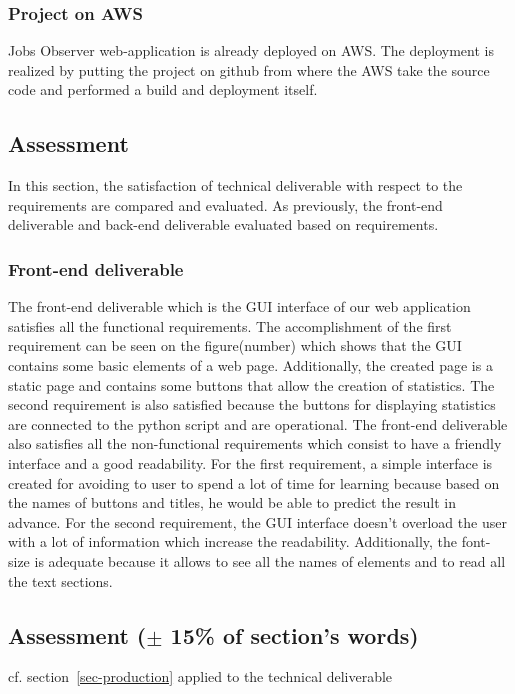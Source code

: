 \documentclass[conference,compsoc]{IEEEtran}
\begin{document}
\subsubsection{Project on AWS}
Jobs Observer web-application is already deployed on AWS. The deployment is realized by putting the project on github from where the AWS take the source code and performed a build and deployment itself. 

\subsection{Assessment}
In this section, the satisfaction of technical deliverable with respect to the requirements are compared and evaluated. As previously, the front-end deliverable and back-end deliverable evaluated based on requirements. 

\subsubsection{Front-end deliverable}
The front-end deliverable which is the GUI interface of our web application satisfies all the functional requirements. The accomplishment of the first requirement can be seen on the figure(number) which shows that the GUI contains some basic elements of a web page. Additionally, the created page is a static page and contains some buttons that allow the creation of statistics. 
\newline                                        
The second requirement is also satisfied because the buttons for displaying statistics are connected to the python script and are operational. 
\newline
The front-end deliverable also satisfies all the non-functional requirements which consist to have a friendly interface and a good readability. For the first requirement, a simple interface is created for avoiding to user to spend a lot of time for learning because based on the names of buttons and titles, he would be able to predict the result in advance.       
\newline                                                            
For the second requirement, the GUI interface doesn’t overload the user with a lot of information which increase the readability. Additionally, the font-size is adequate because it allows to see all the names of elements and to read all the text sections. 

\subsection{Assessment ($\pm$ 15\% of section's words)}
cf. section~\ref{sec-production} applied to the technical deliverable
\end{document}
